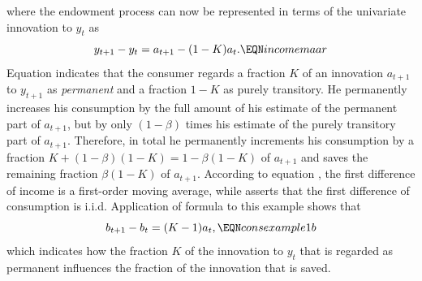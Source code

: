 where the endowment process can now be represented in terms of the univariate innovation to $y_t$ as
$$ y_{t+1} - y_t = a_{t+1} - (1-K) a_t. \EQN incomemaar $$
Equation  indicates that the consumer regards a fraction $K$ of an innovation $a_{t+1}$ to $y_{t+1}$
as {\it permanent} and a fraction $1-K$ as purely transitory. He permanently increases his consumption by the full amount of his estimate of the permanent part of $a_{t+1}$,
but by only $(1-\beta)$ times his estimate of the purely transitory part of $a_{t+1}$.   Therefore, in total  he permanently increments his  consumption by
 a fraction $K + (1-\beta) (1-K) = 1 - \beta (1-K)$  of $a_{t+1}$ and saves the remaining fraction $\beta (1-K)$ of $a_{t+1}$.
  According to equation , the first difference of income is a first-order moving average, while 
  asserts that the first difference of consumption is   i.i.d.
  Application of formula 
to this example shows that
$$ b_{t+1} - b_t = (K-1) a_t , \EQN consexample1b $$
which indicates how the fraction $K$ of the innovation to $y_t$ that is regarded as permanent influences the fraction of the innovation that is saved.



